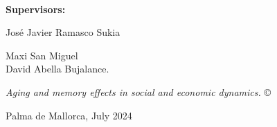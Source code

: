 \documentclass[
	11pt, %
	a4paper,
]{LegrandOrangeBook}
\begin{document}








\thispagestyle{empty} %

~\vfill %
\sffamily

\noindent \textbf{Supervisors:}

\noindent Jos\'e Javier Ramasco Sukia

\noindent Maxi San Miguel \\

\noindent David Abella Bujalance.

\noindent \textit{Aging and memory effects in social and economic dynamics.} \copyright

\noindent Palma de Mallorca, July 2024
\pagebreak


\newpage
\thispagestyle{plain} %
\mbox{}


\newpage
\thispagestyle{plain} %
\mbox{}

\newpage
\thispagestyle{plain} %
\mbox{}


\end{document}
